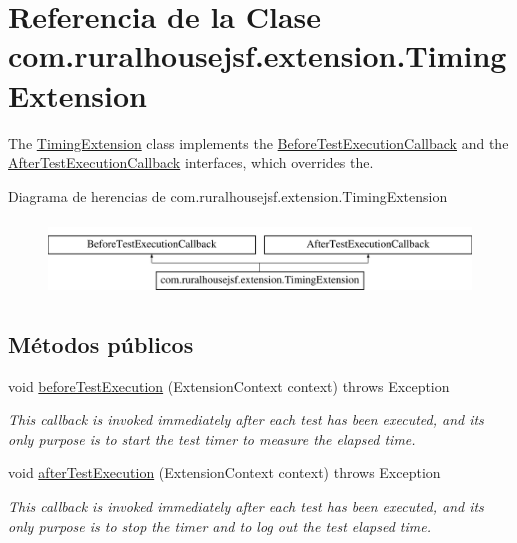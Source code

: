 \hypertarget{a00268}{}\section{Referencia de la Clase com.\+ruralhousejsf.\+extension.\+Timing\+Extension}
\label{a00268}


The \mbox{\hyperlink{a00268}{Timing\+Extension}} class implements the \mbox{\hyperlink{}{Before\+Test\+Execution\+Callback}} and the \mbox{\hyperlink{}{After\+Test\+Execution\+Callback}} interfaces, which overrides the.  


Diagrama de herencias de com.\+ruralhousejsf.\+extension.\+Timing\+Extension\begin{figure}[H]
\begin{center}
\leavevmode
\includegraphics[height=2.000000cm]{a00268}
\end{center}
\end{figure}
\subsection*{Métodos públicos}
\begin{DoxyCompactItemize}
\item 
void \mbox{\hyperlink{a00268_ad19d0a2513bd9041f9263c1d9536ed6c}{before\+Test\+Execution}} (Extension\+Context context)  throws Exception 
\begin{DoxyCompactList}\small\item\em This callback is invoked {\ttfamily immediately after} each test has been executed, and its only purpose is to start the test timer to measure the elapsed time. \end{DoxyCompactList}\item 
void \mbox{\hyperlink{a00268_a300725ce5f0290e9878185e05d84c019}{after\+Test\+Execution}} (Extension\+Context context)  throws Exception 
\begin{DoxyCompactList}\small\item\em This callback is invoked {\ttfamily immediately after} each test has been executed, and its only purpose is to stop the timer and to log out the test elapsed time. \end{DoxyCompactList}\end{DoxyCompactItemize}
